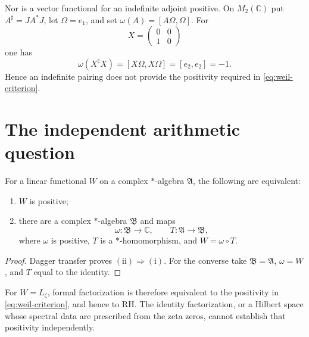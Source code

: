 \documentclass[11pt]{article}
\numberwithin{equation}{section}
\newcommand{\C}{\mathbb C}
\begin{document}
Nor is a vector functional for an indefinite adjoint positive.  On
$M_2(\C)$ put $A^\sharp=JA^*J$, let $\Omega=e_1$, and set
$\omega(A)=[A\Omega,\Omega]$.  For
\[
 X=\begin{pmatrix}0&0\\1&0\end{pmatrix}
\]
one has
\begin{equation}
 \omega(X^\sharp X)=[X\Omega,X\Omega]=[e_2,e_2]=-1.
 \label{eq:indefinite-negative}
\end{equation}
Hence an indefinite pairing does not provide the positivity required in
\eqref{eq:weil-criterion}.

\section{The independent arithmetic question}

\begin{proposition}
For a linear functional $W$ on a complex $*$-algebra $\mathfrak A$, the
following are equivalent:
\begin{enumerate}
\item $W$ is positive;
\item there are a complex $*$-algebra $\mathfrak B$ and maps
\[
 \omega:\mathfrak B\longrightarrow\C,
 \qquad T:\mathfrak A\longrightarrow\mathfrak B,
\]
where $\omega$ is positive, $T$ is a $*$-homomorphism, and
$W=\omega\circ T$.
\end{enumerate}
\end{proposition}

\begin{proof}
Dagger transfer proves $(\mathrm{ii})\Rightarrow(\mathrm{i})$.  For the converse take
$\mathfrak B=\mathfrak A$, $\omega=W$, and $T$ equal to the identity.
\end{proof}

For $W=L_\zeta$, formal factorization is therefore equivalent to the
positivity in \eqref{eq:weil-criterion}, and hence to RH.  The identity
factorization, or a Hilbert space whose spectral data are prescribed from
the zeta zeros, cannot establish that positivity independently.
\end{document}
